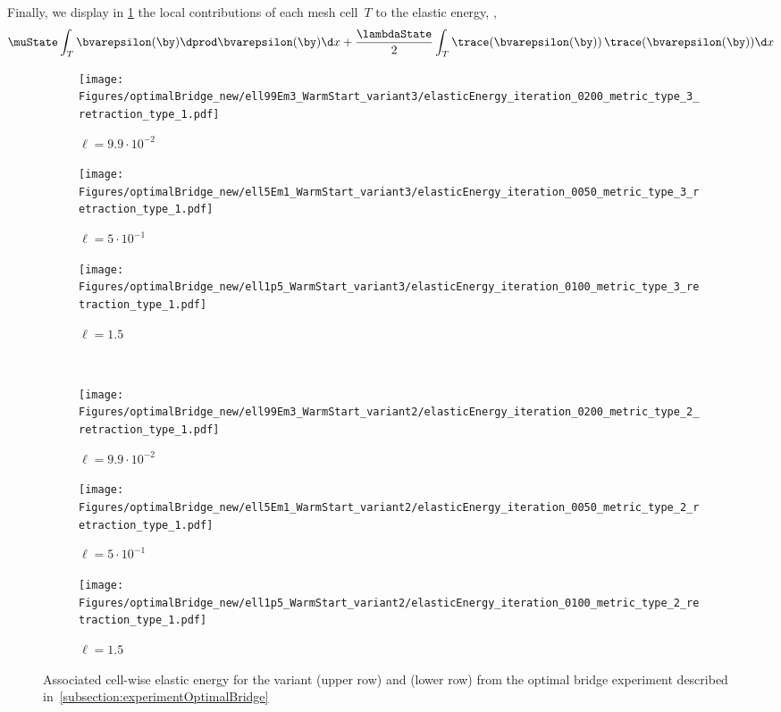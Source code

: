 Finally, we display in \cref{fig:ElasticDef} the local contributions of each mesh cell~$T$ to the elastic energy, \ie,
\begin{equation*}
	\muState \int_T \bvarepsilon(\by) \dprod \bvarepsilon(\by) \d x
	+
	\frac{\lambdaState}{2} \int_T \trace(\bvarepsilon(\by)) \, \trace(\bvarepsilon(\by)) \d x
\end{equation*}

\begin{figure}
	\begin{center}
	\begin{subfigure}{0.32\textwidth}
		\centering
		\texttt{[image: Figures/optimalBridge\_new/ell99Em3\_WarmStart\_variant3/elasticEnergy\_iteration\_0200\_metric\_type\_3\_retraction\_type\_1.pdf]}
		\caption{$\ell = 9.9\cdot 10^{-2}$}
	\end{subfigure}
	\hfill
	\begin{subfigure}{0.32\textwidth}
		\centering
		\texttt{[image: Figures/optimalBridge\_new/ell5Em1\_WarmStart\_variant3/elasticEnergy\_iteration\_0050\_metric\_type\_3\_retraction\_type\_1.pdf]}
		\caption{$\ell = 5\cdot 10^{-1}$}
	\end{subfigure}
	\hfill
	\begin{subfigure}{0.32\textwidth}
		\centering
		\texttt{[image: Figures/optimalBridge\_new/ell1p5\_WarmStart\_variant3/elasticEnergy\_iteration\_0100\_metric\_type\_3\_retraction\_type\_1.pdf]}
		\caption{$\ell = 1.5$}
	\end{subfigure}
	\\
	\begin{subfigure}{0.32\textwidth}
		\centering
		\texttt{[image: Figures/optimalBridge\_new/ell99Em3\_WarmStart\_variant2/elasticEnergy\_iteration\_0200\_metric\_type\_2\_retraction\_type\_1.pdf]}
		\caption{$\ell = 9.9\cdot 10^{-2}$}
	\end{subfigure}
	\hfill
	\begin{subfigure}{0.32\textwidth}
		\centering
		\texttt{[image: Figures/optimalBridge\_new/ell5Em1\_WarmStart\_variant2/elasticEnergy\_iteration\_0050\_metric\_type\_2\_retraction\_type\_1.pdf]}
		\caption{$\ell = 5\cdot 10^{-1}$}
	\end{subfigure}
	\hfill
	\begin{subfigure}{0.32\textwidth}
		\centering
		\texttt{[image: Figures/optimalBridge\_new/ell1p5\_WarmStart\_variant2/elasticEnergy\_iteration\_0100\_metric\_type\_2\_retraction\_type\_1.pdf]}
		\caption{$\ell = 1.5$}
	\end{subfigure}
\end{center}
	\caption{Associated cell-wise elastic energy for the variant \CompEuc (upper row) and \ElasEuc (lower row) from the optimal bridge experiment described in~\cref{subsection:experimentOptimalBridge}}
	\label{fig:ElasticDef}
\end{figure}


